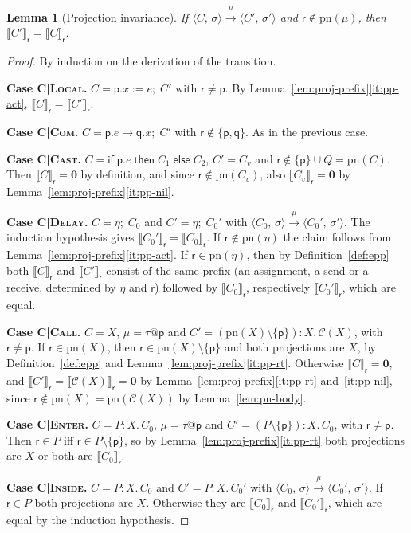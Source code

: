 \documentclass[11pt]{article}
\makeatletter
\theoremstyle{plain}
\newtheorem{lemma}[theorem]{Lemma}
\theoremstyle{definition}
\theoremstyle{remark}
\newcommand{\kw}[1]{\mathsf{#1}}
\newcommand{\kif}{\kw{if}\;}
\newcommand{\kthen}{\;\kw{then}\;}
\newcommand{\kelse}{\;\kw{else}\;}
\newcommand{\nil}{\mathbf{0}}
\newcommand{\seq}{;\;}
\newcommand{\pp}{\mathsf{p}}
\newcommand{\qq}{\mathsf{q}}
\newcommand{\rr}{\mathsf{r}}
\newcommand{\pn}{\mathrm{pn}}
\newcommand{\conf}[2]{\langle #1,\, #2\rangle}
\newcommand{\lto}[1]{\xrightarrow{\;#1\;}}
\newcommand{\proj}[2]{\llbracket #1 \rrbracket_{#2}}
\newcommand{\tauat}[1]{\tau\mathord{@}#1}
\newcommand{\rn}[1]{{\normalfont\scshape #1}}
\newcommand{\ifcond}[3]{\kif #1 \kthen #2 \kelse #3}
\newcommand{\case}[1]{\medskip\noindent\textbf{Case #1.}\;}
\newcommand{\Defs}{\mathcal{C}}
\newcommand{\body}[1]{\Defs(#1)}
\newcommand{\rt}[3]{#1\mathbin{:}#2.\,#3}
\makeatother
\begin{document}
\begin{lemma}[Projection invariance]\label{lem:proj-inv}
  If $\conf{C}{\sigma}\lto{\mu}\conf{C'}{\sigma'}$ and $\rr\notin\pn(\mu)$,
  then $\proj{C'}{\rr} = \proj{C}{\rr}$.
\end{lemma}
\begin{proof}
  By induction on the derivation of the transition.

  \case{\rn{C|Local}}
  $C = \pp.x := e\seq C'$ with $\rr\neq\pp$.  By
  Lemma~\ref{lem:proj-prefix}\ref{it:pp-act}, $\proj{C}{\rr} = \proj{C'}{\rr}$.

  \case{\rn{C|Com}}
  $C = \pp.e\to\qq.x\seq C'$ with $\rr\notin\{\pp,\qq\}$.  As in the previous
  case.

  \case{\rn{C|Cast}}
  $C = \ifcond{\pp.e}{C_1}{C_2}$, $C' = C_v$ and
  $\rr\notin\{\pp\}\cup Q = \pn(C)$.  Then $\proj{C}{\rr} = \nil$ by
  definition, and since $\rr\notin\pn(C_v)$, also $\proj{C_v}{\rr} = \nil$ by
  Lemma~\ref{lem:proj-prefix}\ref{it:pp-nil}.

  \case{\rn{C|Delay}}
  $C = \eta\seq C_0$ and $C' = \eta\seq C_0'$ with
  $\conf{C_0}{\sigma}\lto{\mu}\conf{C_0'}{\sigma'}$.  The induction
  hypothesis gives $\proj{C_0'}{\rr} = \proj{C_0}{\rr}$.  If $\rr\notin\pn(\eta)$
  the claim follows from Lemma~\ref{lem:proj-prefix}\ref{it:pp-act}.  If
  $\rr\in\pn(\eta)$, then by Definition~\ref{def:epp} both $\proj{C}{\rr}$ and
  $\proj{C'}{\rr}$ consist of the same prefix (an assignment, a send or a
  receive, determined by $\eta$ and $\rr$) followed by $\proj{C_0}{\rr}$,
  respectively $\proj{C_0'}{\rr}$, which are equal.

  \case{\rn{C|Call}}
  $C = X$, $\mu = \tauat\pp$ and $C' = \rt{(\pn(X)\setminus\{\pp\})}{X}{\body{X}}$,
  with $\rr\neq\pp$.  If $\rr\in\pn(X)$, then $\rr\in\pn(X)\setminus\{\pp\}$
  and both projections are $X$, by Definition~\ref{def:epp} and
  Lemma~\ref{lem:proj-prefix}\ref{it:pp-rt}.  Otherwise $\proj{C}{\rr} = \nil$,
  and $\proj{C'}{\rr} = \proj{\body{X}}{\rr} = \nil$ by
  Lemma~\ref{lem:proj-prefix}\ref{it:pp-rt} and~\ref{it:pp-nil}, since
  $\rr\notin\pn(X) = \pn(\body{X})$ by Lemma~\ref{lem:pn-body}.

  \case{\rn{C|Enter}}
  $C = \rt{P}{X}{C_0}$, $\mu = \tauat\pp$ and $C' = \rt{(P\setminus\{\pp\})}{X}{C_0}$,
  with $\rr\neq\pp$.  Then $\rr\in P$ iff $\rr\in P\setminus\{\pp\}$, so by
  Lemma~\ref{lem:proj-prefix}\ref{it:pp-rt} both projections are $X$ or both
  are $\proj{C_0}{\rr}$.

  \case{\rn{C|Inside}}
  $C = \rt{P}{X}{C_0}$ and $C' = \rt{P}{X}{C_0'}$ with
  $\conf{C_0}{\sigma}\lto{\mu}\conf{C_0'}{\sigma'}$.  If $\rr\in P$ both
  projections are $X$.  Otherwise they are $\proj{C_0}{\rr}$ and
  $\proj{C_0'}{\rr}$, which are equal by the induction hypothesis.
\end{proof}
\end{document}
